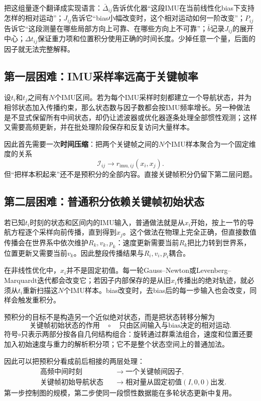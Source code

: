 把这组量逐个翻译成实现语言：$\bar\Delta_{ij}$告诉优化器“这段IMU在当前线性化bias下支持怎样的相对运动”；$J_{ij}$告诉它“bias小幅改变时，这个相对运动如何一阶改变”；$P_{ij}$告诉它“这段测量在哪些局部方向上可靠、在哪些方向上不可靠”；$\bar b$记录$J_{ij}$的展开中心；$\Delta t_{ij}$保证重力项和位置积分使用正确的时间长度。少掉任意一个量，后面的因子就无法完整解释。

\subsection{第一层困难：IMU采样率远高于关键帧率}

设$t_i$和$t_j$之间有$N$个IMU区间。若为每个IMU采样时刻都建立一个导航状态，并为相邻状态加入传播约束，那么状态数与因子数都会按IMU频率增长。另一种做法是不显式保留所有中间状态，却仍让滤波器或优化器逐条处理全部惯性观测；这样又需要高频更新，并在批处理阶段保存和反复访问大量样本。

因此首先需要一次\textbf{时间压缩}：把两个关键帧之间的$N$个IMU样本聚合为一个固定维度的关系
\[
    \mathcal I_{ij}
    \longrightarrow
    r_{\mathrm{imu},ij}(x_i,x_j).
\]
但“把样本积起来”还不是预积分的全部内容。直接关键帧积分仍留下第二层问题。

\subsection{第二层困难：普通积分依赖关键帧初始状态}

若已知$t_i$时刻的状态和区间内的IMU输入，普通做法就是从$x_i$开始，按上一节的导航方程逐个采样向前传播，直到得到$x_j$。这个做法在物理上完全正确，但直接数值传播会在世界系中依次维护$R_k,v_k,p_k$：速度更新需要当前$R_k$把比力转到世界系，位置更新又需要当前$v_k$。因此整段传播结果与$R_i,v_i,p_i$耦合。

在非线性优化中，$x_i$并不是固定初值。每一轮Gauss--Newton或Levenberg--Marquardt迭代都会改变它；若因子内部保存的是从旧$x_i$传播出的绝对轨迹，就必须从$t_i$重新扫描这$N$个IMU样本。bias改变时，去bias后的每一步输入也会改变，同样会触发重积分。

预积分的目标不是构造另一个近似绝对状态，而是把状态转移分解为
\[
    \boxed{
    \text{关键帧初始状态的作用}
    \quad\circ\quad
    \text{只由区间输入与bias决定的相对运动}.
    }
\]
符号$\circ$只表示两部分按各自几何结构组合：旋转通过群乘法组合，速度和位置还要加入初始速度与重力的解析积分项；它不是整个状态空间上的普通加法。

因此可以把预积分看成前后相接的两层处理：
\[
\boxed{
\begin{aligned}
    &\text{高频中间时刻}
      &&\longrightarrow\text{一个关键帧间因子},\\
    &\text{关键帧初始导航状态}
      &&\longrightarrow\text{相对量从固定初值$(I,0,0)$出发}.
\end{aligned}
}
\]
第一步控制图的规模，第二步使同一段惯性数据能在多轮状态更新中复用。

